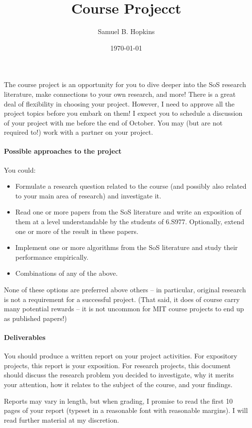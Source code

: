 \documentclass[11pt]{article}
\title{Course Projecct}
\author{Samuel B. Hopkins}
\date{\today}
\theoremstyle{definition}
\begin{document}
\maketitle

The course project is an opportunity for you to dive deeper into the SoS research literature, make connections to your own research, and more! There is a great deal of flexibility in choosing your project. However, I need to approve all the project topics before you embark on them! I expect you to schedule a discussion of your project with me before the end of October. You may (but are not required to!) work with a partner on your project.

\paragraph{Possible approaches to the project}
You could:
\begin{itemize}
\item Formulate a research question related to the course (and possibly also related to your main area of research) and investigate it.
\item Read one or more papers from the SoS literature and write an exposition of them at a level understandable by the students of 6.S977. Optionally, extend one or more of the result in these papers.
\item Implement one or more algorithms from the SoS literature and study their performance empirically.
\item Combinations of any of the above.
\end{itemize}

None of these options are preferred above others -- in particular, original research is not a requirement for a successful project. (That said, it does of course carry many potential rewards --  it is not uncommon for MIT course projects to end up as published papers!)

\paragraph{Deliverables}
You should produce a written report on your project activities. For expository projects, this report is your exposition. For research projects, this document should discuss the research problem you decided to investigate, why it merits your attention, how it relates to the subject of the course, and your findings.

Reports may vary in length, but when grading, I promise to read the first 10 pages of your report (typeset in a reasonable font with reasonable margins). I will read further material at my discretion.
\end{document}

